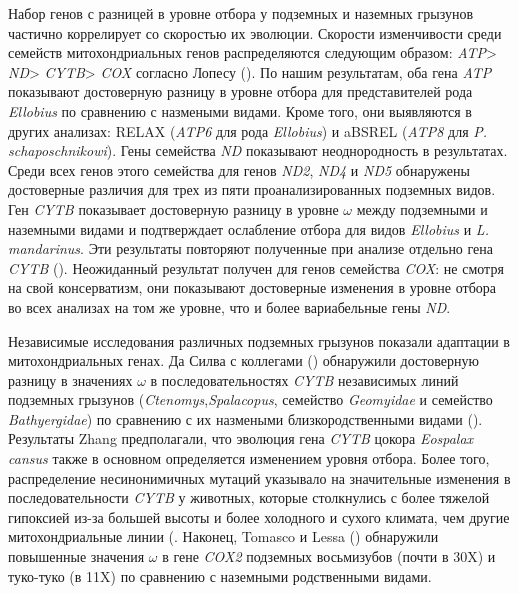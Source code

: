 Набор генов с разницей в уровне отбора у подземных и наземных грызунов частично коррелирует со скоростью их эволюции. Скорости изменчивости среди семейств митохондриальных генов распределяются следующим образом: \textit{ATP}> \textit{ND}> \textit{CYTB}> \textit{COX} согласно Лопесу (\cite{Lopez1997}). По нашим результатам, оба гена \textit{ATP} показывают достоверную разницу в уровне отбора для представителей рода \textit{Ellobius} по сравнению с назмеными видами. Кроме того, они выявляются в других анализах: RELAX (\textit{ATP6} для рода \textit{Ellobius}) и aBSREL (\textit{ATP8} для \textit{P. schaposchnikowi}). Гены семейства \textit{ND} показывают неоднородность в результатах. Среди всех генов этого семейства для генов \textit{ND2}, \textit{ND4} и \textit{ND5} обнаружены достоверные различия для трех из пяти проанализированных подземных видов. Ген \textit{CYTB} показывает достоверную разницу в уровне $\omega$ между подземными и наземными видами и подтверждает ослабление отбора для видов \textit{Ellobius} и \textit{L. mandarinus}. Эти результаты повторяют полученные при анализе отдельно гена \textit{CYTB} (\cite{Bondareva2021}). Неожиданный результат получен для генов семейства \textit{COX}: не смотря на свой консерватизм, они показывают достоверные изменения в уровне отбора во всех анализах на том же уровне, что и более вариабельные гены \textit{ND}.


Независимые исследования различных подземных грызунов показали адаптации в митохондриальных генах. Да Силва с коллегами (\cite{DaSilva2009}) обнаружили достоверную разницу в значениях $\omega$ в последовательностях \textit{CYTB} независимых линий подземных грызунов (\textit{Ctenomys},\textit{Spalacopus}, семейство \textit{Geomyidae} и семейство \textit{Bathyergidae}) по сравнению с их назмеными близкородственными видами (\cite{Tomasco2014}). Результаты Zhang предполагали, что эволюция гена \textit{CYTB} цокора \textit{Eospalax cansus} также в основном определяется изменением уровня отбора. Более того, распределение несинонимичных мутаций указывало на значительные изменения в последовательности \textit{CYTB} у животных, которые столкнулись с более тяжелой гипоксией из-за большей высоты и более холодного и сухого климата, чем другие митохондриальные линии (\cite{Zhang2013a}. Наконец, Tomasco и Lessa (\cite{Tomasco2011}) обнаружили повышенные значения $\omega$ в гене \textit{COX2} подземных восьмизубов (почти в 30X) и туко-туко (в 11X) по сравнению с наземными родственными видами. 


